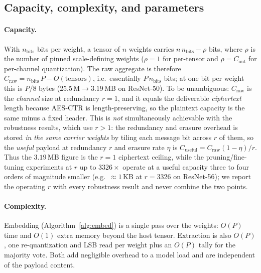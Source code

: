 \documentclass[10pt,journal]{IEEEtran}
\theoremstyle{remark}
\begin{document}
\subsection{Capacity, complexity, and parameters}\label{sec:analysis}
\paragraph{Capacity.} With $n_{\mathrm{bits}}$ bits per weight, a tensor of $n$ weights
carries $n\,n_{\mathrm{bits}}-\rho$ bits, where $\rho$ is the number of pinned
scale-defining weights ($\rho=1$ for per-tensor and $\rho=C_{\mathrm{out}}$ for
per-channel quantization). The raw aggregate is therefore
$C_{\mathrm{raw}}=n_{\mathrm{bits}}\,P-O(\text{tensors})$, i.e.\ essentially
$P\,n_{\mathrm{bits}}$ bits; at one bit per weight this is $P/8$ bytes
($25.5\,\mathrm{M}\to 3.19$\,MB on ResNet-50). To be unambiguous: $C_{\mathrm{raw}}$ is the
\emph{channel} size at redundancy $r=1$, and it equals the deliverable \emph{ciphertext}
length because AES-CTR is length-preserving, so the plaintext capacity is the same minus a
fixed header. This is \emph{not} simultaneously achievable with the robustness results, which
use $r>1$: the redundancy and erasure overhead is stored \emph{in the same carrier weights}
by tiling each message bit across $r$ of them, so the \emph{useful} payload at redundancy $r$
and erasure rate $\eta$ is $C_{\mathrm{useful}}=C_{\mathrm{raw}}(1-\eta)/r$. Thus the
$3.19$\,MB figure is the $r{=}1$ ciphertext ceiling, while the pruning/fine-tuning experiments
at $r$ up to $3326\times$ operate at a useful capacity three to four orders of magnitude
smaller (e.g.\ $\approx 1$\,KB at $r{=}3326$ on ResNet-56); we report the operating $r$ with
every robustness result and never combine the two points.

\paragraph{Complexity.} Embedding (Algorithm~\ref{alg:embed}) is a single pass over the
weights: $O(P)$ time and $O(1)$ extra memory beyond the host tensor. Extraction is also
$O(P)$, one re-quantization and LSB read per weight plus an $O(P)$ tally for the majority
vote. Both add negligible overhead to a model load and are independent of the payload
content.
\end{document}
